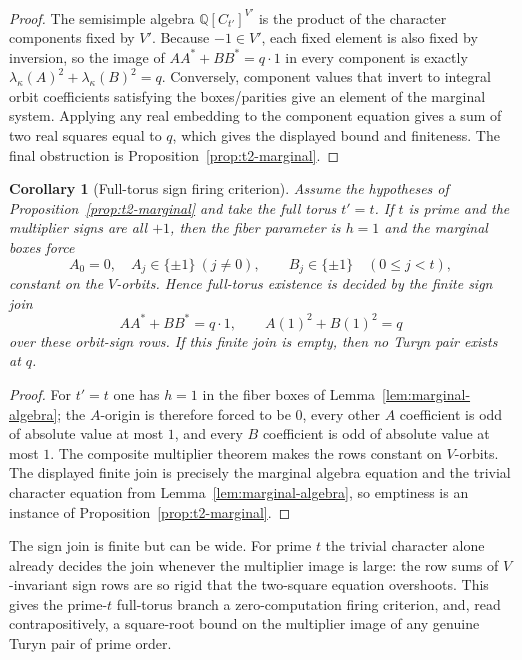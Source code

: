 \documentclass[11pt]{article}
\theoremstyle{plain}
\newtheorem{corollary}[theorem]{Corollary}
\theoremstyle{definition}
\theoremstyle{remark}
\newcommand{\Q}{\mathbb Q}
\begin{document}
\begin{proof}
The semisimple algebra $\Q[C_{t'}]^{V'}$ is the product of the character
components fixed by $V'$.  Because $-1\in V'$, each fixed element is also fixed
by inversion, so the image of $AA^*+BB^*=q\cdot1$ in every component is exactly
$\lambda_\kappa(A)^2+\lambda_\kappa(B)^2=q$.  Conversely, component values that
invert to integral orbit coefficients satisfying the boxes/parities give an
element of the marginal system.  Applying any real embedding to the component
equation gives a sum of two real squares equal to $q$, which gives the displayed
bound and finiteness.  The final obstruction is
Proposition~\ref{prop:t2-marginal}.
\end{proof}

\begin{corollary}[Full-torus sign firing criterion]\label{cor:full-torus-sign}
Assume the hypotheses of Proposition~\ref{prop:t2-marginal} and take the full
torus $t'=t$.  If $t$ is prime and the multiplier signs are all $+1$, then
the fiber parameter is $h=1$ and the marginal boxes force
\[
  A_0=0,\quad A_j\in\{\pm1\}\ (j\ne0),\qquad
  B_j\in\{\pm1\}\quad(0\le j<t),
\]
constant on the $V$-orbits.  Hence full-torus existence is decided by the
finite sign join
\[
  AA^*+BB^*=q\cdot1,\qquad A(1)^2+B(1)^2=q
\]
over these orbit-sign rows.  If this finite join is empty, then no Turyn pair
exists at $q$.
\end{corollary}

\begin{proof}
For $t'=t$ one has $h=1$ in the fiber boxes of
Lemma~\ref{lem:marginal-algebra}; the $A$-origin is therefore forced to be
$0$, every other $A$ coefficient is odd of absolute value at most $1$, and
every $B$ coefficient is odd of absolute value at most $1$.  The composite
multiplier theorem makes the rows constant on $V$-orbits.  The displayed
finite join is precisely the marginal algebra equation and the trivial
character equation from Lemma~\ref{lem:marginal-algebra}, so emptiness is an
instance of Proposition~\ref{prop:t2-marginal}.
\end{proof}

The sign join is finite but can be wide.  For prime $t$ the trivial
character alone already decides the join whenever the multiplier image is
large: the row sums of $V$-invariant sign rows are so rigid that the
two-square equation overshoots.  This gives the prime-$t$ full-torus branch
a zero-computation firing criterion, and, read contrapositively, a
square-root bound on the multiplier image of any genuine Turyn pair of
prime order.
\end{document}
